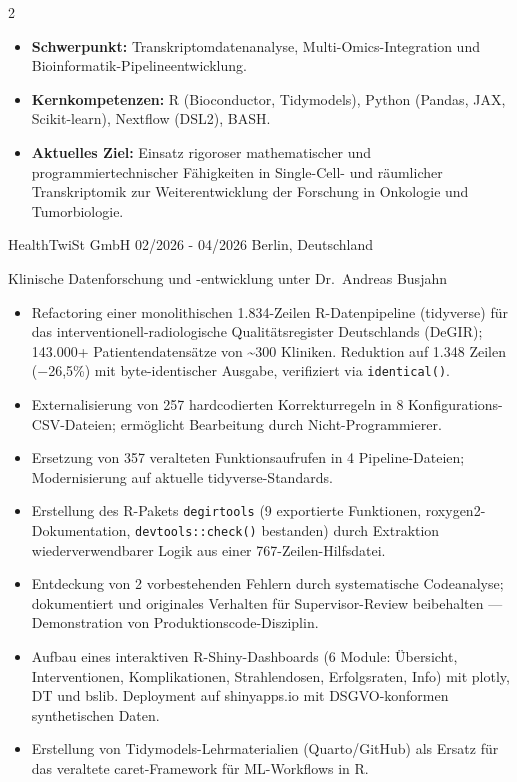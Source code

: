 \documentclass{thejus_cv}
\begin{document}
\begin{paracol}{2}


\begin{itemize}[label=\textbullet, leftmargin=1em]
    \item \textbf{Schwerpunkt:} Transkriptomdatenanalyse, Multi-Omics-Integration und Bioinformatik-Pipelineentwicklung.
    \item \textbf{Kernkompetenzen:} R (Bioconductor, Tidymodels), Python (Pandas, JAX, Scikit-learn), Nextflow (DSL2), BASH.
    \item \textbf{Aktuelles Ziel:} Einsatz rigoroser mathematischer und programmiertechnischer F\"ahigkeiten in Single-Cell- und r\"aumlicher Transkriptomik zur Weiterentwicklung der Forschung in Onkologie und Tumorbiologie.
\end{itemize}


             {HealthTwiSt GmbH}
             {02/2026 - 04/2026}
             {Berlin, Deutschland}
             {Klinische Datenforschung und -entwicklung unter Dr.~Andreas Busjahn
             \begin{itemize}
                   \item Refactoring einer monolithischen 1.834-Zeilen R-Datenpipeline (tidyverse) f\"ur das interventionell-radiologische Qualit\"atsregister Deutschlands (DeGIR); 143.000+ Patientendatens\"atze von \textasciitilde300 Kliniken. Reduktion auf 1.348 Zeilen ($-$26,5\%) mit byte-identischer Ausgabe, verifiziert via \texttt{identical()}.
                   \item Externalisierung von 257 hardcodierten Korrekturregeln in 8 Konfigurations-CSV-Dateien; erm\"oglicht Bearbeitung durch Nicht-Programmierer.
                   \item Ersetzung von 357 veralteten Funktionsaufrufen in 4 Pipeline-Dateien; Modernisierung auf aktuelle tidyverse-Standards.
                   \item Erstellung des R-Pakets \texttt{degirtools} (9 exportierte Funktionen, roxygen2-Dokumentation, \texttt{devtools::check()} bestanden) durch Extraktion wiederverwendbarer Logik aus einer 767-Zeilen-Hilfsdatei.
                   \item Entdeckung von 2 vorbestehenden Fehlern durch systematische Codeanalyse; dokumentiert und originales Verhalten f\"ur Supervisor-Review beibehalten --- Demonstration von Produktionscode-Disziplin.
                   \item Aufbau eines interaktiven R-Shiny-Dashboards (6 Module: \"Ubersicht, Interventionen, Komplikationen, Strahlendosen, Erfolgsraten, Info) mit plotly, DT und bslib. Deployment auf shinyapps.io mit DSGVO-konformen synthetischen Daten.
                   \item Erstellung von Tidymodels-Lehrmaterialien (Quarto/GitHub) als Ersatz f\"ur das veraltete caret-Framework f\"ur ML-Workflows in R.
               \end{itemize}}


\end{paracol}
\end{document}

